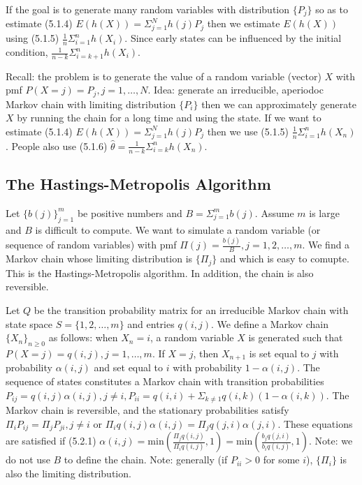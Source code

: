 \documentclass{article}
\begin{document}
If the goal is to generate many random variables with distribution $\{P_j\}$ so as to estimate (5.1.4) $E(h(X)) = \Sigma_{j=1}^N h(j) P_j$ then we estimate $E(h(X))$ using (5.1.5) $\frac{1}{n} \Sigma_{i=1}^n h(X_i)$. Since early states can be influenced by the initial condition, $\frac{1}{n-k} \Sigma_{i=k+1}^n h(X_i)$.

Recall: the problem is to generate the value of a random variable (vector) $X$ with pmf $P(X=j) = P_j, j = 1, \dots, N$. Idea: generate an irreducible, aperiodoc Markov chain with limiting distribution $\{P_i\}$ then we can approximately generate $X$ by running the chain for a long time and using the state. If we want to estimate (5.1.4) $E(h(X)) = \Sigma_{j=1}^N h(j) P_j$ then we use (5.1.5) $\frac{1}{n} \Sigma_{i=1}^n h(X_n)$. People also use (5.1.6) $\widehat \theta = \frac{1}{n-k} \Sigma_{i=k}^n h(X_n)$.

\subsection{The Hastings-Metropolis Algorithm}

Let $\{b(j)\}_{j=1}^m$ be positive numbers and $B = \Sigma_{j=1}^m b(j)$. Assume $m$ is large and $B$ is difficult to compute. We want to simulate a random variable (or sequence of random variables) with pmf $\Pi(j) = \frac{b(j)}{B}, j = 1, 2, \dots, m$. We find a Markov chain whose limiting distribution is $\{\Pi_j\}$ and which is easy to comupte. This is the Hastings-Metropolis algorithm. In addition, the chain is also reversible.

Let $Q$ be the transition probability matrix for an irreducible Markov chain with state space $S = \{1, 2, \dots, m\}$ and entries $q(i, j)$. We define a Markov chain $\{X_n\}_{n \ge 0}$ as follows: when $X_n = i$, a random variable $X$ is generated such that $P(X=j) = q(i, j), j = 1, \dots, m$. If $X = j$, then $X_{n+1}$ is set equal to $j$ with probability $\alpha(i, j)$ and set equal to $i$ with probability $1 - \alpha(i, j)$. The sequence of states constitutes a Markov chain with transition probabilities $P_{ij} = q(i, j) \alpha(i, j), j \ne i, P_{ii} = q(i, i) + \Sigma_{k \ne 1} q(i, k) (1 - \alpha(i, k))$. The Markov chain is reversible, and the stationary probabilities satisfy $\Pi_i P_{ij} = \Pi_j P_{ji}, j \ne i$ or $\Pi_i q(i,j) \alpha(i, j) = \Pi_j q(j, i) \alpha(j, i)$. These equations are satisfied if (5.2.1) $\alpha(i, j) = \mathrm{min}(\frac{\Pi_j q(i, j)}{\Pi_i q(i, j)}, 1) = \mathrm{min}(\frac{b_j q(j, i)}{b_i q(i, j)}, 1)$. Note: we do not use $B$ to define the chain. Note: generally (if $P_{ii} > 0$ for some $i$), $\{\Pi_i\}$ is also the limiting distribution.
\end{document}
